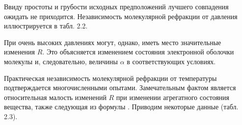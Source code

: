 Ввиду простоты и грубости исходных предположений лучшего
совпадения ожидать не приходится. Независимость молекулярной
рефракции от давления иллюстрируется в табл. 2.2. 
\begin{figure}[tbp]

\hbox{\vbox{}} 
\end{figure}

При очень высоких давлениях могут, однако, иметь место
значительные изменения $R$. Это объясняется изменением состояния
электронной оболочки молекулы и, следовательно, величины $\alpha$
в соответствующих условиях.

Практическая независимость молекулярной рефракции от температуры
подтверждается многочисленными опытами. Замечательным фактом
является относительная малость изменений $R$ при изменении
агрегатного состояния вещества, также следующая из формулы
. Приводим некоторые данные (табл. 2.3).

